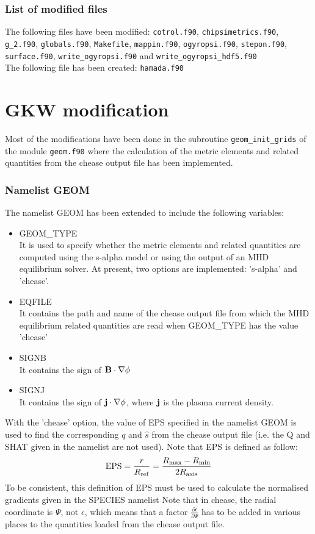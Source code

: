 \documentclass[a4paper,12pt]{article}
\newcommand{\ind}[1]{\ensuremath{_{\rm{#1}}}}
\begin{document}
\section{List of modified files}
The following files have been modified: \texttt{cotrol.f90}, \texttt{chipsimetrics.f90}, \texttt{g\_2.f90}, \texttt{globals.f90}, \texttt{Makefile}, \texttt{mappin.f90}, \texttt{ogyropsi.f90}, \texttt{stepon.f90}, \texttt{surface.f90}, \texttt{write\_ogyropsi.f90} and \texttt{write\_ogyropsi\_hdf5.f90} \\
The following file has been created:
\texttt{hamada.f90}

\part{GKW modification}
Most of the modifications have been done in the subroutine \texttt{geom\_init\_grids} of the module \texttt{geom.f90} where the calculation of the metric elements and related quantities from the chease output file has been implemented. 
\section{Namelist GEOM}
The namelist GEOM has been extended to include the following variables:
\begin{itemize}
 \item GEOM\_TYPE\\
It is used to specify whether the metric elements and related quantities are computed using the s-alpha model or using the output of an MHD equilibrium solver. At present, two options are implemented: 's-alpha' and 'chease'.
 \item EQFILE\\
It contains the path and name of the chease output file from which the MHD equilibrium related quantities are read when GEOM\_TYPE has the value 'chease'
 \item SIGNB\\
It contains the sign of $\bf{B}\cdot\nabla\phi$
 \item SIGNJ\\
It contains the sign of $\bf{j}\cdot\nabla\phi$, where $\bf{j}$ is the plasma current density.

\end{itemize}
With the 'chease' option, the value of EPS specified in the namelist GEOM is used to find the corresponding $q$ and $\hat{s}$ from the chease output file (i.e. the Q and SHAT given in the namelist are not used). Note that EPS is defined as follow:
$$\mathrm{EPS}=\frac{r}{R\ind{ref}}=\frac{R\ind{max}-R\ind{min}}{2R\ind{axis}}$$
To be consistent, this definition of EPS must be used to calculate the normalised gradients given in the SPECIES namelist
Note that in chease, the radial coordinate is $\Psi$, not $\epsilon$, which means that a factor $\frac{\partial \epsilon}{\partial \Psi}$ has to be added in various places to the quantities loaded from the chease output file.
\end{document}
